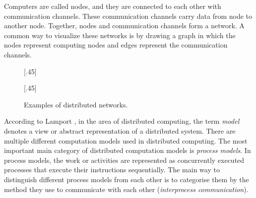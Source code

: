 Computers are called nodes, and they are connected to each other with communication channels.
These communication channels carry data from node to another node.
Together, nodes and communication channels form a network.
A common way to visualize these networks is by drawing a graph in which the nodes represent computing nodes and edges represent the communication channels.
\cite{HirvonenSuomelaDistAlg2020}


\begin{figure}[h]
    [.45\linewidth] {
    \centering
  }
  \hfill
    [.45\linewidth] {
    \centering
  }
  \caption{Examples of distributed networks.}
  \label{fig:dist_comp1}
\end{figure}
According to Lamport \cite{DBLP:books/el/leeuwen90/LamportL90}, in the area of distributed computing, the term \emph{model} denotes a view or abstract representation of a distributed system.
There are multiple different computation models used in distributed computing.
The most important main category of distributed computation models is \emph{process models}.
In process models, the work or activities are represented as concurrently executed processes that execute their instructions sequentially.
The main way to distinguish different process models from each other is to categorise them by the method they use to communicate with each other (\emph{interprocess communication}).
\cite{DBLP:books/el/leeuwen90/LamportL90}


